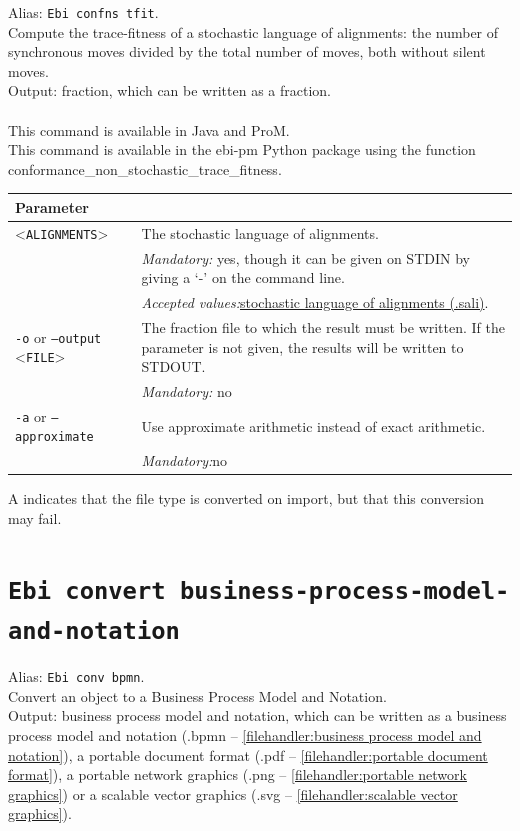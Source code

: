 {Alias: \texttt{Ebi confns tfit}.\\
Compute the trace-fitness of a stochastic language of alignments: the number of synchronous moves divided by the total number of moves, both without silent moves.\\
\noindent Output: fraction, which can be written as a fraction.\\
\\This command is available in Java and ProM.
\\This command is available in the ebi-pm Python package using the function conformance\_non\_stochastic\_trace\_fitness.
\begin{tabularx}{\linewidth}{lX}
\toprule
Parameter \\\midrule
<\texttt{ALIGNMENTS}>&The stochastic language of alignments.\\
&\textit{Mandatory:} \quad yes, though it can be given on STDIN by giving a `-' on the command line.\\
&\textit{Accepted values:}\quad \hyperref[filehandler:stochastic language of alignments]{stochastic language of alignments (.sali)}.\\
\texttt{-o} or \texttt{--output} <\texttt{FILE}> &
The fraction file to which the result must be written. If the parameter is not given, the results will be written to STDOUT.\\
&\textit{Mandatory:} \quad no\\
\texttt{-a} or \texttt{--approximate} & Use approximate arithmetic instead of exact arithmetic.\\
&\textit{Mandatory:}\quad no\\
\bottomrule
\end{tabularx}
A \textdagger{} indicates that the file type is converted on import, but that this conversion may fail.
\clearpage\section{\texttt{Ebi convert business-process-model-and-notation}}
\label{command:Ebi convert business-process-model-and-notation}
Alias: \texttt{Ebi conv bpmn}.\\
Convert an object to a Business Process Model and Notation.\\
\noindent Output: business process model and notation, which can be written as a business process model and notation (.bpmn -- \cref{filehandler:business process model and notation}), a portable document format (.pdf -- \cref{filehandler:portable document format}), a portable network graphics (.png -- \cref{filehandler:portable network graphics}) or a scalable vector graphics (.svg -- \cref{filehandler:scalable vector graphics}).\\
}
